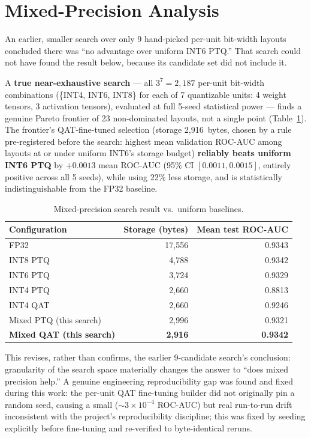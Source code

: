 \documentclass[11pt]{article}
\begin{document}
\section{Mixed-Precision Analysis}
\label{sec:mixed}

An earlier, smaller search over only 9 hand-picked per-unit bit-width layouts concluded there was
``no advantage over uniform INT6 PTQ.'' That search could not have found the result below, because its
candidate set did not include it.

A \textbf{true near-exhaustive search} --- all $3^7 = 2{,}187$ per-unit bit-width combinations
(\{INT4, INT6, INT8\} for each of 7 quantizable units: 4 weight tensors, 3 activation tensors),
evaluated at full 5-seed statistical power --- finds a genuine Pareto frontier of 23 non-dominated
layouts, not a single point (Table~\ref{tab:mixed}). The frontier's QAT-fine-tuned selection (storage
2{,}916~bytes, chosen by a rule pre-registered before the search: highest mean validation ROC-AUC among
layouts at or under uniform INT6's storage budget) \textbf{reliably beats uniform INT6 PTQ} by
$+0.0013$ mean ROC-AUC (95\% CI $[0.0011, 0.0015]$, entirely positive across all 5 seeds), while using
22\% less storage, and is statistically indistinguishable from the FP32 baseline.

\begin{table}[h]
\centering
\caption{Mixed-precision search result vs.\ uniform baselines.}
\label{tab:mixed}
\begin{tabular}{lrr}
\toprule
Configuration & Storage (bytes) & Mean test ROC-AUC \\
\midrule
FP32                        & 17{,}556 & 0.9343 \\
INT8 PTQ                    & 4{,}788  & 0.9342 \\
INT6 PTQ                    & 3{,}724  & 0.9329 \\
INT4 PTQ                    & 2{,}660  & 0.8813 \\
INT4 QAT                    & 2{,}660  & 0.9246 \\
Mixed PTQ (this search)     & 2{,}996  & 0.9321 \\
\textbf{Mixed QAT (this search)} & \textbf{2{,}916} & \textbf{0.9342} \\
\bottomrule
\end{tabular}
\end{table}

This revises, rather than confirms, the earlier 9-candidate search's conclusion: granularity of the
search space materially changes the answer to ``does mixed precision help.'' A genuine engineering
reproducibility gap was found and fixed during this work: the per-unit QAT fine-tuning builder did not
originally pin a random seed, causing a small (${\sim}3\times10^{-4}$ ROC-AUC) but real run-to-run
drift inconsistent with the project's reproducibility discipline; this was fixed by seeding explicitly
before fine-tuning and re-verified to byte-identical reruns.
\end{document}
